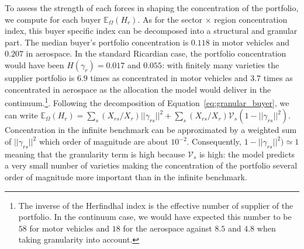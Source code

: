 To assess the strength of each forces in shaping the concentration of the portfolio, we compute for each buyer $\mathbb{E}_\Omega(H_r)$. As for the sector $\times$ region concentration index, this buyer specific index can be decomposed into a structural and granular part. The median buyer's portfolio concentration is $0.118$ in motor vehicles and $0.207$ in aerospace. In the standard Ricardian case, the portfolio concentration would have been $H(\gamma_{r})=0.017$ and $0.055$: with finitely many varieties the supplier portfolio is $6.9$ times as concentrated in motor vehicles and $3.7$ times as concentrated in aerospace as the allocation the model would deliver in the continuum.\footnote{The inverse of the Herfindhal index is the effective number of supplier of the portfolio. In the continuum case, we would have expected this number to be $58$ for motor vehicles and $18$ for the aerospace against $8.5$ and $4.8$ when taking granularity into account. }. Following the decomposition of Equation~\ref{eq:granular_buyer}, we can write $\mathbb{E}_\Omega(H_r) = \sum_s (X_{rs}/X_r)||\gamma_{rs}||^2 + \sum_s(X_{rs}/X_r)\mathcal{V}_s(1-||\gamma_{rs}||^2)$. Concentration in the infinite benchmark can be approximated by a weighted sum of  $||\gamma_{rs}||^2$ which order of magnitude are about $10^{-2}$. Consequently, $1-||\gamma_{rs}||^2) \simeq 1$ meaning that the granularity term is high because $\mathcal{V}_s$ is high: the model predicts a very small number of varieties making the concentration of the portfolio several order of magnitude more important than in the infinite benchmark.  


